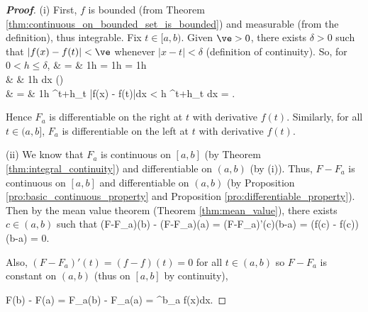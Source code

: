 \begin{proof}[\bf Proof]
\ben
\item [(i)] First, $f$ is bounded (from Theorem \ref{thm:continuous_on_bounded_set_is_bounded}) and measurable (from the definition), thus integrable. Fix $t \in [a, b)$. Given $\ve > 0$, there exists $\delta > 0$ such that $|f(x) - f(t)| < \ve$ whenever $|x - t| <\delta$ (definition of continuity). So, for $0 < h \leq \delta$,
\beast
{} & = & \frac 1h  = \frac 1h   = \frac 1h  \\
& \leq & \frac 1h \int {}dx \quad\quad ()\\
& = & \frac 1h \int^{t+h}_t |f(x) - f(t)|dx < \frac {\ve}h \int^{t+h}_t dx = \ve.
\eeast

Hence $F_a$ is differentiable on the right at $t$ with derivative $f(t)$. Similarly, for all $t \in (a, b]$, $F_a$ is differentiable on the left at $t$ with derivative $f(t)$.

\item [(ii)] We know that $F_a$ is continuous on $[a,b]$ (by Theorem \ref{thm:integral_continuity}) and differentiable on $(a,b)$ (by (i)). Thus, $F-F_a$ is continuous on $[a,b]$ and differentiable on $(a,b)$ (by Proposition \ref{pro:basic_continuous_property} and Proposition \ref{pro:differentiable_property}). Then by the mean value theorem (Theorem \ref{thm:mean_value}), there exists $c\in (a,b)$ such that
\be
(F-F_a)(b) - (F-F_a)(a) = (F-F_a)'(c)(b-a) = (f(c) - f(c))(b-a) = 0.
\ee

Also, $(F -F_a)'(t) = (f-f)(t) = 0$ for all $t \in (a, b)$ so $F -F_a$ is constant on $(a,b)$ (thus on $[a,b]$ by continuity),

\be
F(b) - F(a) = F_a(b) - F_a(a) = \int^b_a f(x)dx.
\ee
\een
\end{proof}

